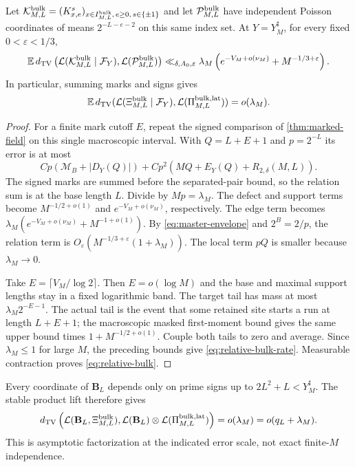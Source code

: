 \begin{theorem}\label{thm:relative-bulk}
Let $\mathcal K^{\rm bulk}_{M,L}=(K^s_{x,e})_{x\in I^{\rm bulk}_{M,L},\,e\ge0,\,s\in\{\pm1\}}$
and let $\mathcal P^{\rm bulk}_{M,L}$ have independent Poisson coordinates
of means $2^{-L-e-2}$ on this same index set. At $Y=Y_M^\sharp$, for every
fixed $0<\varepsilon<1/3$,
\begin{equation}\label{eq:relative-bulk-rate}
 \mathbb E\,d_{\mathrm{TV}}\left(\mathcal L(\mathcal K^{\rm bulk}_{M,L}\mid\mathcal F_Y),
                         \mathcal L(\mathcal P^{\rm bulk}_{M,L})\right)
 \ll_{\delta,A_0,\varepsilon}\lambda_M
               \left(e^{-V_M+o(\nu_M)}+M^{-1/3+\varepsilon}\right).
\end{equation}
In particular, summing marks and signs gives
\begin{equation}\label{eq:relative-bulk}
 \mathbb E\,d_{\mathrm{TV}}(\mathcal L(\Xi^{\rm bulk}_{M,L}\mid\mathcal F_Y),
                    \mathcal L(\Pi^{\rm bulk,lat}_{M,L}))=o(\lambda_M).
\end{equation}
\end{theorem}
\begin{proof}
For a finite mark cutoff $E$, repeat the signed comparison of
\cref{thm:marked-field} on this single macroscopic interval. With
$Q=L+E+1$ and $p=2^{-L}$ its error is at most
\[
 Cp(\mathcal M_B+|D_Y(Q)|)
       +Cp^2(MQ+E_Y(Q)+R_{2,\delta}(M,L)).
\]
The signed marks are summed before the separated-pair bound, so the
relation sum is at the base length $L$. Divide by $Mp=\lambda_M$.
The defect and support terms become $M^{-1/2+o(1)}$ and
$e^{-V_M+o(\nu_M)}$, respectively. The edge term becomes
$\lambda_M(e^{-V_M+o(\nu_M)}+M^{-1+o(1)})$.
By \eqref{eq:master-envelope} and $2^B=2/p$, the relation term is
$O_\varepsilon(M^{-1/3+\varepsilon}(1+\lambda_M))$.
The local term $pQ$ is smaller because $\lambda_M\to0$.

Take $E=\lceil V_M/\log2\rceil$. Then $E=o(\log M)$ and the base and
maximal support lengths stay in a fixed logarithmic band. The target
tail has mass at most $\lambda_M2^{-E-1}$. The actual tail is the event
that some retained site starts a run at length $L+E+1$; the macroscopic
masked first-moment bound gives the same upper bound times
$1+M^{-1/2+o(1)}$. Couple both tails to zero and average. Since
$\lambda_M\le1$ for large $M$, the preceding bounds give
\eqref{eq:relative-bulk-rate}. Measurable contraction proves
\eqref{eq:relative-bulk}.
\end{proof}
Every coordinate of $\mathbf B_L$ depends only on prime signs up to
$2L^2+L<Y_M^\sharp$. The stable product lift therefore gives
\begin{equation}\label{eq:boundary-bulk-factorization}
 d_{\mathrm{TV}}\left(\mathcal L(\mathbf B_L,\Xi^{\rm bulk}_{M,L}),
       \mathcal L(\mathbf B_L)\otimes\mathcal L(\Pi^{\rm bulk,lat}_{M,L})\right)
       =o(\lambda_M)=o(q_L+\lambda_M).
\end{equation}
This is asymptotic factorization at the indicated error scale, not exact
finite-$M$ independence.

